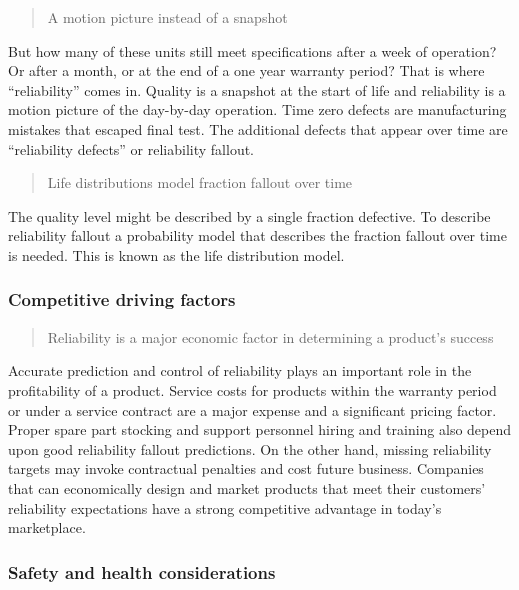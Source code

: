 \documentclass[]{book}
\theoremstyle{definition}
\theoremstyle{definition}
\theoremstyle{definition}
\theoremstyle{remark}
\begin{document}
\begin{quote}
A motion picture instead of a snapshot
\end{quote}

But how many of these units still meet specifications after a week of
operation? Or after a month, or at the end of a one year warranty
period? That is where ``reliability'' comes in. Quality is a snapshot at
the start of life and reliability is a motion picture of the day-by-day
operation. Time zero defects are manufacturing mistakes that escaped
final test. The additional defects that appear over time are
``reliability defects'' or reliability fallout.

\begin{quote}
Life distributions model fraction fallout over time
\end{quote}

The quality level might be described by a single fraction defective. To
describe reliability fallout a probability model that describes the
fraction fallout over time is needed. This is known as the life
distribution model.

\subsubsection{Competitive driving
factors}\label{competitive-driving-factors}

\begin{quote}
Reliability is a major economic factor in determining a product's
success
\end{quote}

Accurate prediction and control of reliability plays an important role
in the profitability of a product. Service costs for products within the
warranty period or under a service contract are a major expense and a
significant pricing factor. Proper spare part stocking and support
personnel hiring and training also depend upon good reliability fallout
predictions. On the other hand, missing reliability targets may invoke
contractual penalties and cost future business. Companies that can
economically design and market products that meet their customers'
reliability expectations have a strong competitive advantage in today's
marketplace.

\subsubsection{Safety and health
considerations}\label{safety-and-health-considerations}
\end{document}
